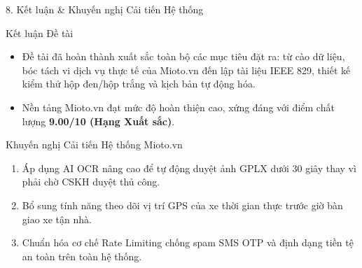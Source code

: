 \documentclass[aspectratio=169,10pt]{beamer}
\begin{document}
\begin{frame}{8. Kết luận \& Khuyến nghị Cải tiến Hệ thống}
  \begin{block}{Kết luận Đề tài}
    \begin{itemize}
      \item Đề tài đã hoàn thành xuất sắc toàn bộ các mục tiêu đặt ra: từ cào dữ liệu, bóc tách vi dịch vụ thực tế của Mioto.vn đến lập tài liệu IEEE 829, thiết kế kiểm thử hộp đen/hộp trắng và kịch bản tự động hóa.
      \item Nền tảng Mioto.vn đạt mức độ hoàn thiện cao, xứng đáng với điểm chất lượng \textbf{9.00/10 (Hạng Xuất sắc)}.
    \end{itemize}
  \end{block}

  \begin{block}{Khuyến nghị Cải tiến Hệ thống Mioto.vn}
    \begin{enumerate}
      \item Áp dụng AI OCR nâng cao để tự động duyệt ảnh GPLX dưới 30 giây thay vì phải chờ CSKH duyệt thủ công.
      \item Bổ sung tính năng theo dõi vị trí GPS của xe thời gian thực trước giờ bàn giao xe tận nhà.
      \item Chuẩn hóa cơ chế Rate Limiting chống spam SMS OTP và định dạng tiền tệ an toàn trên toàn hệ thống.
    \end{enumerate}
  \end{block}
\end{frame}
\end{document}
